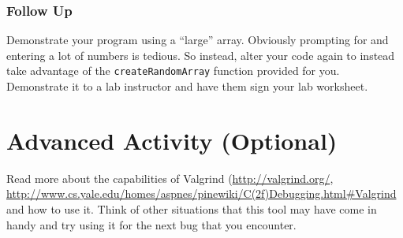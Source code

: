 \documentclass[12pt]{scrartcl}
\begin{document}
\subsubsection*{Follow Up}

Demonstrate your program using a ``large'' array.  Obviously prompting 
for and entering a lot of numbers is tedious.  So instead, alter your code 
again to instead take advantage of the \texttt{createRandomArray} 
function provided for you.  Demonstrate it to a lab instructor and have 
them sign your lab worksheet. 

\section{Advanced Activity (Optional)}

Read more about the capabilities of Valgrind (\url{http://valgrind.org/}, 
\url{http://www.cs.yale.edu/homes/aspnes/pinewiki/C(2f)Debugging.html#Valgrind}
and how to use it.  Think of other situations that this tool may have come in
handy and try using it for the next bug that you encounter.  
\end{document}
